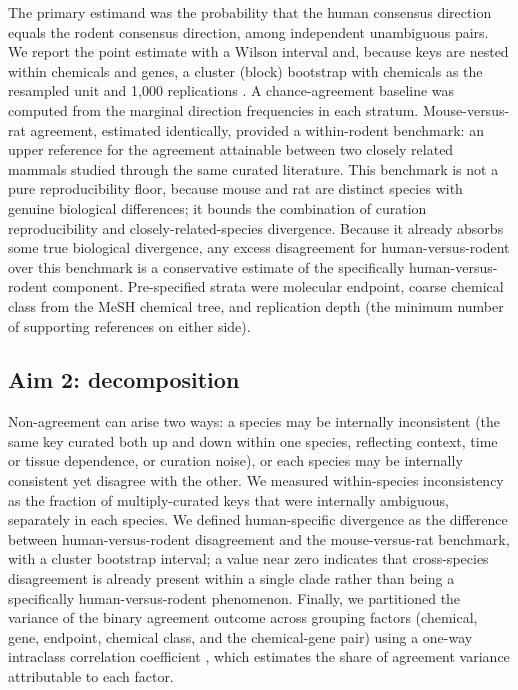 \documentclass[review,12pt,authoryear]{elsarticle}
\begin{document}
The primary estimand was the probability that the human consensus direction
equals the rodent consensus direction, among independent unambiguous pairs. We
report the point estimate with a Wilson interval \citep{wilson1927} and, because
keys are nested within chemicals and genes, a cluster (block) bootstrap with
chemicals as the resampled unit and 1{,}000 replications \citep{davison1997boot}.
A chance-agreement baseline was computed from the marginal direction
frequencies in each stratum. Mouse-versus-rat agreement, estimated identically,
provided a within-rodent benchmark: an upper reference for the agreement
attainable between two closely related mammals studied through the same curated
literature. This benchmark is not a pure reproducibility floor, because mouse and
rat are distinct species with genuine biological differences; it bounds the
combination of curation reproducibility and closely-related-species divergence.
Because it already absorbs some true biological divergence, any excess
disagreement for human-versus-rodent over this benchmark is a conservative
estimate of the specifically human-versus-rodent component.
Pre-specified strata were molecular endpoint, coarse chemical class from the
MeSH chemical tree, and replication depth (the minimum number of supporting
references on either side).

\subsection{Aim 2: decomposition}

Non-agreement can arise two ways: a species may be internally inconsistent (the
same key curated both up and down within one species, reflecting context, time
or tissue dependence, or curation noise), or each species may be internally
consistent yet disagree with the other. We measured within-species
inconsistency as the fraction of multiply-curated keys that were internally
ambiguous, separately in each species. We defined human-specific divergence as
the difference between human-versus-rodent disagreement and the mouse-versus-rat
benchmark, with a cluster bootstrap interval; a value near zero indicates that
cross-species disagreement is already present within a single clade rather than
being a specifically human-versus-rodent phenomenon. Finally, we partitioned the variance of the
binary agreement outcome across grouping factors (chemical, gene, endpoint,
chemical class, and the chemical-gene pair) using a one-way intraclass
correlation coefficient \citep{shrout1979icc}, which estimates the share of
agreement variance attributable to each factor.
\end{document}

